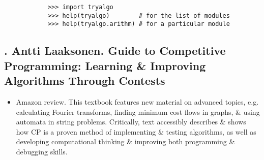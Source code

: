 \documentclass{article}
\begin{document}
\begin{itemize}
\begin{itemize}
		\begin{verbatim}
			>>> import tryalgo
			>>> help(tryalgo)		 # for the list of modules
			>>> help(tryalgo.arithm) # for a particular module
		\end{verbatim}
	\end{itemize}
\end{itemize}


\subsection{\cite{Laaksonen2020,Laaksonen2024}. {\sc Antti Laaksonen}. Guide to Competitive Programming: Learning \& Improving Algorithms Through Contests}
\begin{itemize}
	\item {\sf Amazon review.} This textbook features new material on advanced topics, e.g. calculating Fourier transforms, finding minimum cost flows in graphs, \& using automata in string problems. Critically, text accessibly describes \& shows how CP is a proven method of implementing \& testing algorithms, as well as developing computational thinking \& improving both programming \& debugging skills.
	

\end{itemize}
\end{document}
